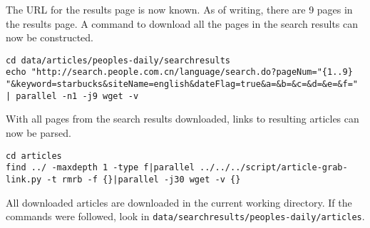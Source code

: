 The URL for the results page is now known. As of writing, there are 9 pages in
the results page. A command to download all the pages in the search results can
now be constructed.
\begin{verbatim}
cd data/articles/peoples-daily/searchresults
echo "http://search.people.com.cn/language/search.do?pageNum="{1..9}
"&keyword=starbucks&siteName=english&dateFlag=true&a=&b=&c=&d=&e=&f="
| parallel -n1 -j9 wget -v
\end{verbatim}
With all pages from the search results downloaded, links to resulting articles
can now be parsed.
\begin{verbatim}
cd articles
find ../ -maxdepth 1 -type f|parallel ../../../script/article-grab-link.py -t rmrb -f {}|parallel -j30 wget -v {}
\end{verbatim}
All downloaded articles are downloaded in the current working directory. If the
commands were followed, look in
\texttt{data/searchresults/peoples-daily/articles}.


